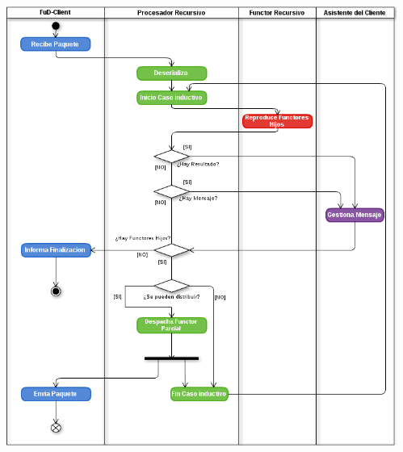 \begin{frame}
\begin{columns}[T]
\begin{column}{.3\textwidth}
\begin{center}
            \end{center}
        \end{column}
        \begin{column}{.7\textwidth}
            \raggedleft
            \includegraphics[scale=0.26]{images/ActivityRecAbs-2.png}
        \end{column}
    \end{columns}
\end{frame}

